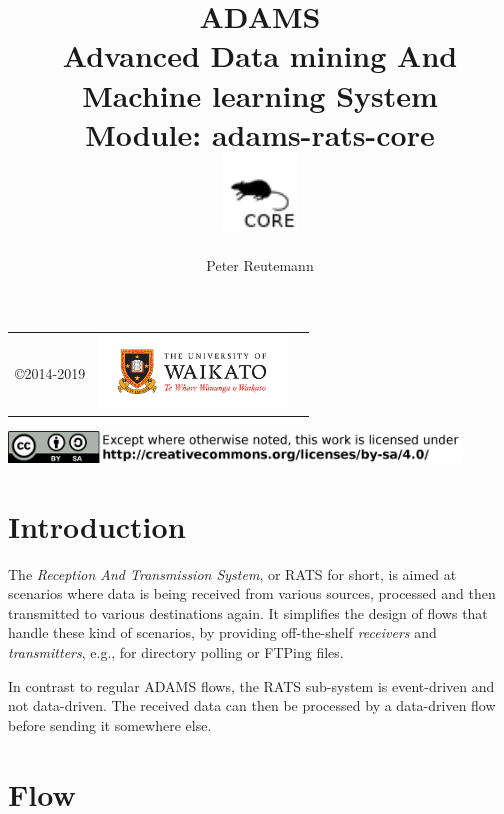 \documentclass[a4paper]{book}
\title{
  \textbf{ADAMS} \\
  {\Large \textbf{A}dvanced \textbf{D}ata mining \textbf{A}nd \textbf{M}achine
  learning \textbf{S}ystem} \\
  {\Large Module: adams-rats-core} \\
  \vspace{1cm}
  \includegraphics[width=2cm]{images/rats-core-module.png} \\
}
\author{
  Peter Reutemann
}
\begin{document}
\begin{titlepage}
\maketitle

\thispagestyle{empty}
\center
\begin{table}[b]
	\begin{tabular}{c l l}
		\parbox[c][2cm]{2cm}{\copyright 2014-2019} &
		\parbox[c][2cm]{5cm}{\includegraphics[width=5cm]{images/coat_of_arms.pdf}}
	\end{tabular}
	\includegraphics[width=12cm]{images/cc.png} \\
\end{table}

\end{titlepage}

\tableofcontents

\chapter{Introduction}
The \textit{Reception And Transmission System}, or RATS for short, is aimed
at scenarios where data is being received from various sources, processed
and then transmitted to various destinations again. It simplifies the design
of flows that handle these kind of scenarios, by providing off-the-shelf
\textit{receivers} and \textit{transmitters}, e.g., for directory polling
or FTPing files.

In contrast to regular ADAMS flows, the RATS sub-system is event-driven
and not data-driven. The received data can then be processed by a data-driven
flow before sending it somewhere else.


\chapter{Flow}
\end{document}
